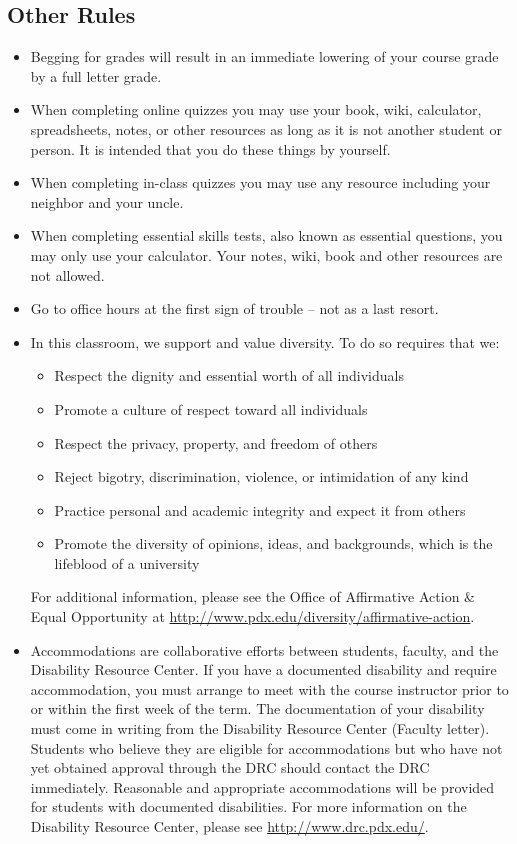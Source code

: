 \documentclass[letterpaper,10pt]{article}
\begin{document}
\subsection{Other Rules}
\begin{itemize}


\item Begging for grades will result in an immediate lowering of your
  course grade by a full letter grade.
  
  \item When completing online quizzes you may use your book, wiki, calculator, spreadsheets, notes, or other resources as long as it is not another student or person.  It is intended that you do these things by yourself.
  
   \item  When completing in-class quizzes you may use any resource including your neighbor and your uncle.
  
   \item When completing essential skills tests, also known as essential questions, you may only use your calculator.  Your notes, wiki, book and other resources are not allowed.

\item Go to office hours at the first sign of trouble -- not as a last
  resort.

\item In this classroom, we support and value diversity.  To do so requires that we:
\begin{itemize}
   \item Respect the dignity and essential worth of all individuals
   \item Promote a culture of respect toward all individuals
    \item Respect the privacy, property, and freedom of others
    \item Reject bigotry, discrimination, violence, or intimidation of any kind
    \item Practice personal and academic integrity and expect it from others
   \item Promote the diversity of opinions, ideas, and backgrounds, which is
    the lifeblood of a university
\end{itemize}

 For additional information, please see the Office of Affirmative Action \& Equal Opportunity at \url{http://www.pdx.edu/diversity/affirmative-action}.


\item Accommodations are collaborative efforts between students, faculty, and the Disability Resource Center.  If you have a documented disability and require accommodation, you must arrange to meet with the course instructor prior to or within the first week of the term.  The documentation of your disability must come in writing from the Disability Resource Center (Faculty letter).  Students who believe they are eligible for accommodations but who have not yet obtained approval through the DRC should contact the DRC immediately.  Reasonable and appropriate accommodations will be provided for students with documented disabilities.  For more information on the Disability Resource Center, please see \url{http://www.drc.pdx.edu/}. 


\end{itemize}
\end{document}
